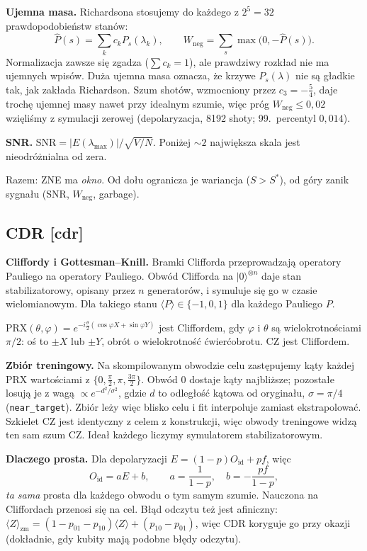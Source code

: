\documentclass[11pt,a4paper]{article}
\newcommand{\slid}[1]{\hfill{\normalfont\small\ttfamily\color{axbluedk}[#1]}}
\newcommand{\ev}[1]{\langle #1\rangle}
\newcommand{\ket}[1]{|#1\rangle}
\newcommand{\Oid}{O_{\mathrm{id}}}
\newcommand{\PRX}{\mathrm{PRX}}
\begin{document}
\textbf{Ujemna masa.} Richardsona stosujemy do każdego z $2^5=32$ prawdopodobieństw stanów:
\[
  \hat P(s)=\sum_kc_kP_s(\lambda_k),\qquad W_{\text{neg}}=\sum_s\max\big(0,-\hat P(s)\big).
\]
Normalizacja zawsze się zgadza ($\sum c_k=1$), ale prawdziwy rozkład nie ma ujemnych wpisów. Duża
ujemna masa oznacza, że krzywe $P_s(\lambda)$ nie są gładkie tak, jak zakłada Richardson. Szum
shotów, wzmocniony przez $c_3=-\frac54$, daje trochę ujemnej masy nawet przy idealnym szumie, więc
próg $W_{\text{neg}}\le0{,}02$ wzięliśmy z symulacji zerowej (depolaryzacja, 8192 shoty;
99.\ percentyl $0{,}014$).

\textbf{SNR.} $\mathrm{SNR}=|E(\lambda_{\max})|/\sqrt{V/N}$. Poniżej $\sim2$ największa skala jest
nieodróżnialna od zera.

Razem: ZNE ma \emph{okno}. Od dołu ogranicza je wariancja ($S>S^*$), od góry zanik sygnału
(SNR, $W_{\text{neg}}$, garbage).

\subsection{CDR \slid{cdr}}

\textbf{Cliffordy i Gottesman--Knill.} Bramki Clifforda przeprowadzają operatory Pauliego na
operatory Pauliego. Obwód Clifforda na $\ket0^{\otimes n}$ daje stan stabilizatorowy, opisany
przez $n$ generatorów, i symuluje się go w czasie wielomianowym. Dla takiego stanu
$\ev{P}\in\{-1,0,1\}$ dla każdego Pauliego $P$.

$\PRX(\theta,\varphi)=e^{-i\frac\theta2(\cos\varphi X+\sin\varphi Y)}$ jest Cliffordem, gdy
$\varphi$ i $\theta$ są wielokrotnościami $\pi/2$: oś to $\pm X$ lub $\pm Y$, obrót o
wielokrotność ćwierćobrotu. CZ jest Cliffordem.

\textbf{Zbiór treningowy.} Na skompilowanym obwodzie celu zastępujemy kąty każdej PRX wartościami
z $\{0,\frac\pi2,\pi,\frac{3\pi}2\}$. Obwód 0 dostaje kąty najbliższe; pozostałe losują je z wagą
$\propto e^{-d^2/\sigma^2}$, gdzie $d$ to odległość kątowa od oryginału, $\sigma=\pi/4$
(\texttt{near\_target}). Zbiór leży więc blisko celu i fit interpoluje zamiast ekstrapolować.
Szkielet CZ jest identyczny z celem z konstrukcji, więc obwody treningowe widzą ten sam szum CZ.
Ideał każdego liczymy symulatorem stabilizatorowym.

\textbf{Dlaczego prosta.} Dla depolaryzacji $E=(1-p)\Oid+pf$, więc
\[
  \Oid=aE+b,\qquad a=\frac1{1-p},\quad b=-\frac{pf}{1-p},
\]
\emph{ta sama} prosta dla każdego obwodu o tym samym szumie. Nauczona na Cliffordach przenosi się
na cel. Błąd odczytu też jest afiniczny: $\ev Z_{\text{zm}}=(1-p_{01}-p_{10})\ev Z+(p_{10}-p_{01})$,
więc CDR koryguje go przy okazji (dokładnie, gdy kubity mają podobne błędy odczytu).
\end{document}
